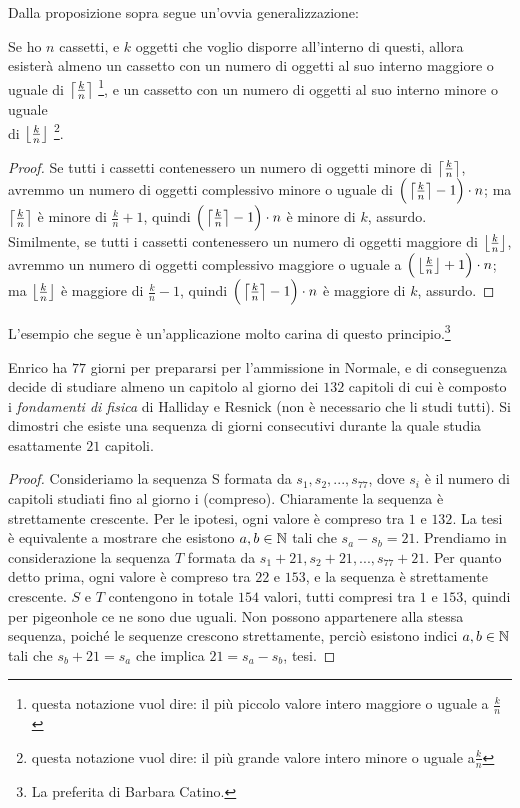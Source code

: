 \documentclass[11pt]{scrartcl}
\begin{document}
	Dalla proposizione sopra segue un'ovvia generalizzazione:
	\begin{proposition}
		Se ho $n$ cassetti, e $k$ oggetti che voglio disporre all'interno di questi, allora esisterà almeno un cassetto con un numero di oggetti al suo interno maggiore o uguale di $\left\lceil \frac{k}{n} \right\rceil$ \footnote{questa notazione vuol dire: il più piccolo valore intero maggiore o uguale a $\frac{k}{n}$}, e un cassetto con un numero di oggetti al suo interno minore o uguale \\
		di $\left\lfloor \frac{k}{n} \right\rfloor$ \footnote{questa notazione vuol dire: il più grande valore intero minore o uguale a$ \frac{k}{n}$}.
	\end{proposition}
	
	\begin{proof}
		Se tutti i cassetti contenessero un numero di oggetti minore di $\left\lceil \frac{k}{n} \right\rceil$, avremmo un numero di oggetti complessivo minore o uguale di $\Big(\left\lceil \frac{k}{n} \right\rceil-1\Big) \cdot n$; ma $\left\lceil \frac{k}{n} \right\rceil$ è minore di $\frac{k}{n}+1$, quindi $\Big(\left\lceil \frac{k}{n} \right\rceil-1\Big) \cdot n$ è minore di $k$, assurdo. \\
		Similmente, se tutti i cassetti contenessero un numero di oggetti maggiore di $\left\lfloor \frac{k}{n} \right\rfloor$, avremmo un numero di oggetti complessivo maggiore o uguale a $\Big(\left\lfloor \frac{k}{n} \right\rfloor+1\Big) \cdot n$; ma $\left\lfloor \frac{k}{n} \right\rfloor$ è maggiore di $\frac{k}{n}-1$, quindi $\Big(\left\lceil \frac{k}{n} \right\rceil-1\Big) \cdot n$ è maggiore di $k$, assurdo.
	\end{proof}
	
	L'esempio che segue è un'applicazione molto carina di questo principio.\footnote{La preferita di Barbara Catino.}
	\begin{exercise}
		Enrico ha $77$ giorni per prepararsi per l'ammissione in Normale, e di conseguenza decide di studiare almeno un capitolo al giorno dei $132$ capitoli di cui è composto i \textit{fondamenti di fisica} di Halliday e Resnick (non è necessario che li studi tutti). Si dimostri che esiste una sequenza di giorni consecutivi durante la quale studia esattamente $21$ capitoli.
	\end{exercise}
	\begin{proof}
		Consideriamo la sequenza S formata da $s_1, s_2, ..., s_{77}$, dove $s_i$ è il numero di capitoli studiati fino al giorno i (compreso). Chiaramente la sequenza è strettamente crescente. Per le ipotesi, ogni valore è compreso tra $1$ e $132$. La tesi è equivalente a mostrare che esistono $a,b\in\mathbb N$ tali che $s_a-s_b=21$. Prendiamo in considerazione la sequenza $T$ formata da $s_1+21, s_2+21, ..., s_{77}+21$. Per quanto detto prima, ogni valore è compreso tra $22$ e $153$, e la sequenza è strettamente crescente. $S$ e $T$ contengono in totale $154$ valori, tutti compresi tra $1$ e $153$, quindi per pigeonhole ce ne sono due uguali. Non possono appartenere alla stessa sequenza, poiché le sequenze crescono strettamente, perciò esistono indici $a,b\in\mathbb N$ tali che $s_b+21=s_a $ che implica $21=s_a-s_b$, tesi.
	\end{proof}
\end{document}

